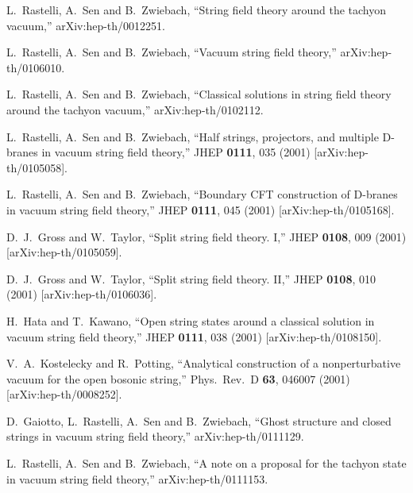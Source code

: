 \documentclass[a4paper,12pt]{article}
\begin{document}
\begingroup\raggedright\begin{thebibliography}{10}

L.~Rastelli, A.~Sen and B.~Zwiebach,
``String field theory around the tachyon vacuum,''
arXiv:hep-th/0012251.

L.~Rastelli, A.~Sen and B.~Zwiebach,
``Vacuum string field theory,''
arXiv:hep-th/0106010.


L.~Rastelli, A.~Sen and B.~Zwiebach,
``Classical solutions in string field theory around the tachyon vacuum,''
arXiv:hep-th/0102112.

L.~Rastelli, A.~Sen and B.~Zwiebach,
``Half strings, projectors, and multiple D-branes in vacuum string field  theory,''
JHEP {\bf 0111}, 035 (2001)
[arXiv:hep-th/0105058].

L.~Rastelli, A.~Sen and B.~Zwiebach,
``Boundary CFT construction of D-branes in vacuum string field theory,''
JHEP {\bf 0111}, 045 (2001)
[arXiv:hep-th/0105168].

D.~J.~Gross and W.~Taylor,
``Split string field theory. I,''
JHEP {\bf 0108}, 009 (2001)
[arXiv:hep-th/0105059].

D.~J.~Gross and W.~Taylor,
``Split string field theory. II,''
JHEP {\bf 0108}, 010 (2001)
[arXiv:hep-th/0106036].

H.~Hata and T.~Kawano,
``Open string states around a classical solution in vacuum string field  theory,''
JHEP {\bf 0111}, 038 (2001)
[arXiv:hep-th/0108150].

V.~A.~Kostelecky and R.~Potting,
``Analytical construction of a nonperturbative vacuum for the open  bosonic string,''
Phys.\ Rev.\ D {\bf 63}, 046007 (2001)
[arXiv:hep-th/0008252].

D.~Gaiotto, L.~Rastelli, A.~Sen and B.~Zwiebach,
``Ghost structure and closed strings in vacuum string field theory,''
arXiv:hep-th/0111129.

L.~Rastelli, A.~Sen and B.~Zwiebach,
``A note on a proposal for the tachyon state in vacuum string field  theory,''
arXiv:hep-th/0111153.


\end{thebibliography}
\end{document}
